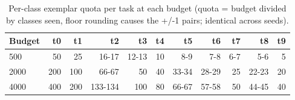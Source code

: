 \documentclass{article}
\begin{document}
\begin{table}[htbp]
  \centering
  \caption{Per-class exemplar quota per task at each budget (quota = budget divided by classes seen, floor rounding causes the +/-1 pairs; identical across seeds).}
  \label{tab:A6_bank_sizes}
  \begin{tabular}{lrrrrrrrrrr}
    \toprule
    \textbf{Budget} & \textbf{t0} & \textbf{t1} & \textbf{t2} & \textbf{t3} & \textbf{t4} & \textbf{t5} & \textbf{t6} & \textbf{t7} & \textbf{t8} & \textbf{t9} \\
    \midrule
    500 & 50 & 25 & 16-17 & 12-13 & 10 & 8-9 & 7-8 & 6-7 & 5-6 & 5 \\
    2000 & 200 & 100 & 66-67 & 50 & 40 & 33-34 & 28-29 & 25 & 22-23 & 20 \\
    4000 & 400 & 200 & 133-134 & 100 & 80 & 66-67 & 57-58 & 50 & 44-45 & 40 \\
    \bottomrule
  \end{tabular}
\end{table}
\end{document}
